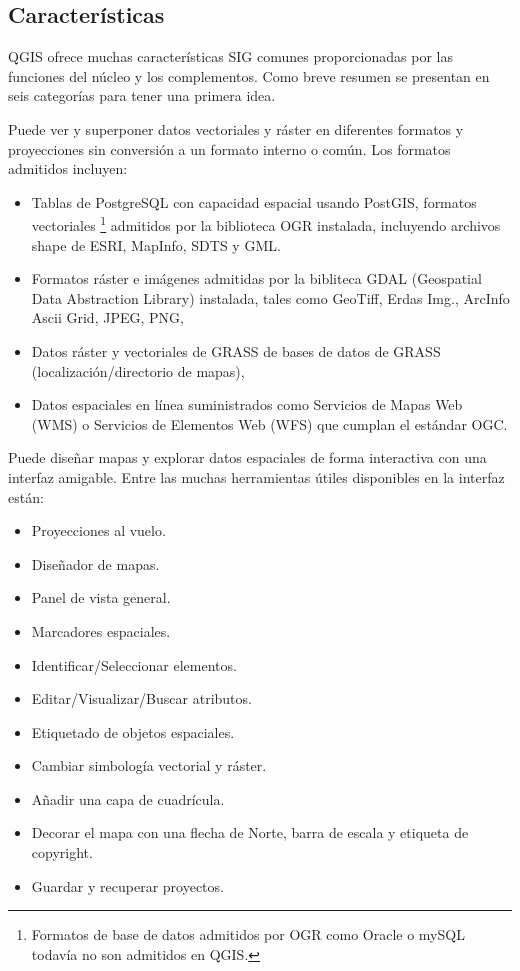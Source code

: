 \subsection{Características}\label{label_majfeat}

QGIS ofrece muchas características SIG comunes proporcionadas por las funciones del núcleo y
los complementos. Como breve resumen se presentan en seis categorías para tener una 
primera idea.


Puede ver y superponer datos vectoriales y ráster en diferentes formatos y
proyecciones sin conversión a un formato interno o común. Los formatos
admitidos incluyen:

\begin{itemize}
\item Tablas de PostgreSQL con capacidad espacial usando PostGIS, formatos vectoriales
\footnote{Formatos de base de datos admitidos por OGR como Oracle o mySQL todavía no son
admitidos en QGIS.} admitidos por la biblioteca OGR instalada, incluyendo archivos shape
de ESRI, MapInfo, SDTS y GML.
\item Formatos ráster e imágenes admitidas por la bibliteca GDAL (Geospatial
Data Abstraction Library) instalada, tales como 
GeoTiff, Erdas Img., ArcInfo Ascii Grid, JPEG, PNG,
\item Datos ráster y vectoriales de GRASS de bases de datos de GRASS (localización/directorio de mapas), 
\item Datos espaciales en línea suministrados como Servicios de Mapas Web (WMS) o
Servicios de Elementos Web (WFS) que cumplan el estándar OGC.
\end{itemize}


Puede diseñar mapas y explorar datos espaciales de forma interactiva con una interfaz
amigable. Entre las muchas herramientas útiles disponibles en la interfaz están:

\begin{itemize}
\item Proyecciones al vuelo.
\item Diseñador de mapas.
\item Panel de vista general.
\item Marcadores espaciales.
\item Identificar/Seleccionar elementos.
\item Editar/Visualizar/Buscar atributos.
\item Etiquetado de objetos espaciales.
\item Cambiar simbología vectorial y ráster.
\item Añadir una capa de cuadrícula.
\item Decorar el mapa con una flecha de Norte, barra de escala y etiqueta de copyright.
\item Guardar y recuperar proyectos.
\end{itemize}

